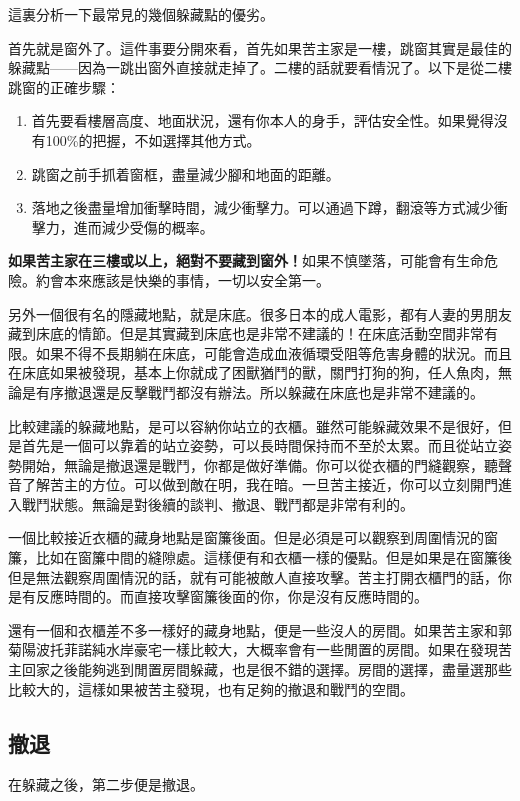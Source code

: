 這裏分析一下最常見的幾個躲藏點的優劣。

首先就是窗外了。這件事要分開來看，首先如果苦主家是一樓，跳窗其實是最佳的躲藏點——因為一跳出窗外直接就走掉了。二樓的話就要看情況了。以下是從二樓跳窗的正確步驟：
\begin{enumerate}
\item 首先要看樓層高度、地面狀況，還有你本人的身手，評估安全性。如果覺得沒有100\%的把握，不如選擇其他方式。
\item 跳窗之前手抓着窗框，盡量減少腳和地面的距離。
\item 落地之後盡量增加衝擊時間，減少衝擊力。可以通過下蹲，翻滾等方式減少衝擊力，進而減少受傷的概率。
\end{enumerate}

\textbf{如果苦主家在三樓或以上，絕對不要藏到窗外！}如果不慎墜落，可能會有生命危險。約會本來應該是快樂的事情，一切以安全第一。

另外一個很有名的隱藏地點，就是床底。很多日本的成人電影，都有人妻的男朋友藏到床底的情節。但是其實藏到床底也是非常不建議的！在床底活動空間非常有限。如果不得不長期躺在床底，可能會造成血液循環受阻等危害身體的狀況。而且在床底如果被發現，基本上你就成了困獸猶鬥的獸，關門打狗的狗，任人魚肉，無論是有序撤退還是反擊戰鬥都沒有辦法。所以躲藏在床底也是非常不建議的。

比較建議的躲藏地點，是可以容納你站立的衣櫃。雖然可能躲藏效果不是很好，但是首先是一個可以靠着的站立姿勢，可以長時間保持而不至於太累。而且從站立姿勢開始，無論是撤退還是戰鬥，你都是做好準備。你可以從衣櫃的門縫觀察，聽聲音了解苦主的方位。可以做到敵在明，我在暗。一旦苦主接近，你可以立刻開門進入戰鬥狀態。無論是對後續的談判、撤退、戰鬥都是非常有利的。

一個比較接近衣櫃的藏身地點是窗簾後面。但是必須是可以觀察到周圍情況的窗簾，比如在窗簾中間的縫隙處。這樣便有和衣櫃一樣的優點。但是如果是在窗簾後但是無法觀察周圍情況的話，就有可能被敵人直接攻擊。苦主打開衣櫃門的話，你是有反應時間的。而直接攻擊窗簾後面的你，你是沒有反應時間的。

還有一個和衣櫃差不多一樣好的藏身地點，便是一些沒人的房間。如果苦主家和郭菊陽波托菲諾純水岸豪宅一樣比較大，大概率會有一些閒置的房間。如果在發現苦主回家之後能夠逃到閒置房間躲藏，也是很不錯的選擇。房間的選擇，盡量選那些比較大的，這樣如果被苦主發現，也有足夠的撤退和戰鬥的空間。

\subsection{撤退}

在躲藏之後，第二步便是撤退。


